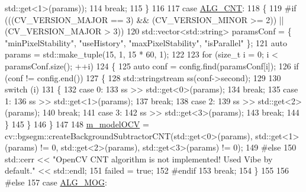 \begin{DoxyCode}
      std::get<1>(params));
114             \textcolor{keywordflow}{break};
115         \}
116 
117         \textcolor{keywordflow}{case} \mbox{\hyperlink{class_background_subtract_a56850081696df68b55f87b4f3d87949fa4e734ae21b8add9022427f8da9469cfb}{ALG\_CNT}}:
118         \{
119 \textcolor{preprocessor}{#if (((CV\_VERSION\_MAJOR == 3) && (CV\_VERSION\_MINOR >= 2)) || (CV\_VERSION\_MAJOR > 3))}
120             std::vector<std::string> paramsConf = \{ \textcolor{stringliteral}{"minPixelStability"}, \textcolor{stringliteral}{"useHistory"}, \textcolor{stringliteral}{"maxPixelStability"},
       \textcolor{stringliteral}{"isParallel"} \};
121             \textcolor{keyword}{auto} params = std::make\_tuple(15, 1, 15 * 60, 1);
122 
123             \textcolor{keywordflow}{for} (\textcolor{keywordtype}{size\_t} i = 0; i < paramsConf.size(); ++i)
124             \{
125                 \textcolor{keyword}{auto} conf = config.find(paramsConf[i]);
126                 \textcolor{keywordflow}{if} (conf != config.end())
127                 \{
128                     std::stringstream ss(conf->second);
129 
130                     \textcolor{keywordflow}{switch} (i)
131                     \{
132                     \textcolor{keywordflow}{case} 0:
133                         ss >> std::get<0>(params);
134                         \textcolor{keywordflow}{break};
135                     \textcolor{keywordflow}{case} 1:
136                         ss >> std::get<1>(params);
137                         \textcolor{keywordflow}{break};
138                     \textcolor{keywordflow}{case} 2:
139                         ss >> std::get<2>(params);
140                         \textcolor{keywordflow}{break};
141                     \textcolor{keywordflow}{case} 3:
142                         ss >> std::get<3>(params);
143                         \textcolor{keywordflow}{break};
144                     \}
145                 \}
146             \}
147 
148             \mbox{\hyperlink{class_background_subtract_a80782a38138a430437095f625603e599}{m\_modelOCV}} = cv::bgsegm::createBackgroundSubtractorCNT(std::get<0>(params), 
      std::get<1>(params) != 0, std::get<2>(params), std::get<3>(params) != 0);
149 \textcolor{preprocessor}{#else}
150             std::cerr << \textcolor{stringliteral}{"OpenCV CNT algorithm is not implemented! Used Vibe by default."} << std::endl;
151             failed = \textcolor{keyword}{true};
152 \textcolor{preprocessor}{#endif}
153             \textcolor{keywordflow}{break};
154         \}
155 
156 \textcolor{preprocessor}{#else}
157         \textcolor{keywordflow}{case} \mbox{\hyperlink{class_background_subtract_a56850081696df68b55f87b4f3d87949fa6ce3f5db7dc79642df7c113be3a28d14}{ALG\_MOG}}:

\end{DoxyCode}
